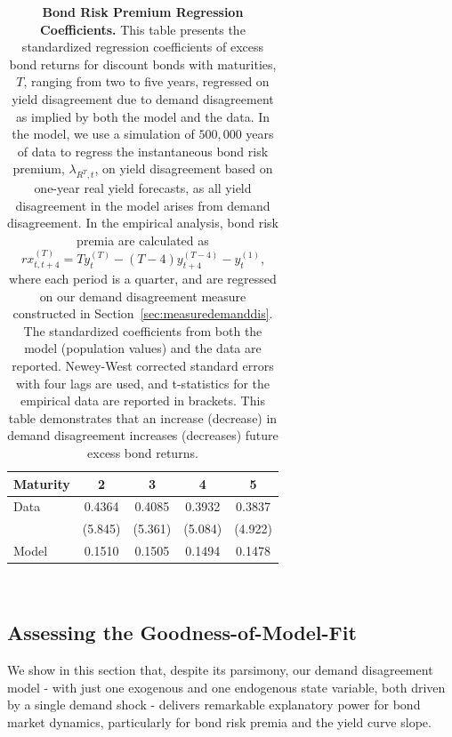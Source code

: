 \documentclass[preprint,11pt,authoryear]{elsarticle}
\theoremstyle{plain}
\begin{document}
\begin{table}[h!]
\centering
\begin{tabular}{lcccc}
\toprule
\textbf{Maturity} & \textbf{2} & \textbf{3} & \textbf{4} & \textbf{5} \\ 
\midrule
Data   & 0.4364  &  0.4085  & 0.3932  & 0.3837  \\ 
       & (5.845) &  (5.361) & (5.084) & (4.922) \\ 
\midrule
Model  & 0.1510  & 0.1505  & 0.1494  & 0.1478  \\ 
\bottomrule
\end{tabular} \\ \vspace{0.2cm}
\caption{\textbf{Bond Risk Premium Regression Coefficients.} This table presents the standardized regression coefficients of excess bond returns for discount bonds with maturities, $T$,  ranging from two to five years, regressed on yield disagreement due to demand disagreement as implied by both the model and the data. In the model, we use a simulation of $500,000$ years of data to regress the instantaneous bond risk premium, $\lambda_{R^T,t}$, on yield disagreement based on one-year real yield forecasts, as all yield disagreement in the model arises from demand disagreement. In the empirical analysis, bond risk premia are calculated as $rx^{(T)}_{t,t+4} = T y^{(T)}_{t} - (T-4)y^{(T-4)}_{t+4} - y^{(1)}_{t}$, where each period is a quarter, and are regressed on our demand disagreement measure constructed in Section~\ref{sec:measuredemanddis}. The standardized coefficients from both the model (population values) and the data are reported. Newey-West corrected standard errors with four lags are used, and t-statistics for the empirical data are reported in brackets. This table demonstrates that an increase (decrease) in demand disagreement increases (decreases) future excess bond returns.}
\label{table:regRP}
\end{table}




\subsection{Assessing the Goodness-of-Model-Fit}\label{sec:backout}



We show in this section that, despite its parsimony, our demand disagreement model - with just one exogenous and one endogenous state variable, both driven by a single demand shock - delivers remarkable explanatory power for bond market dynamics, particularly for bond risk premia and the yield curve slope.
\end{document}
